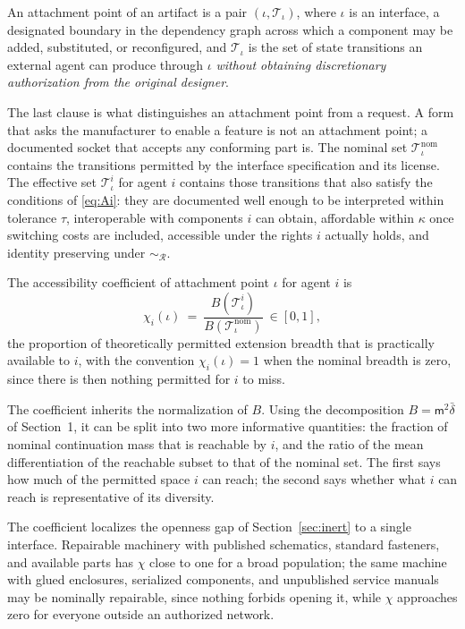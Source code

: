 \begin{definition}
An attachment point of an artifact is a pair $(\iota,\mathcal{T}_\iota)$, where $\iota$ is an interface, a designated boundary in the dependency graph across which a component may be added, substituted, or reconfigured, and $\mathcal{T}_\iota$ is the set of state transitions an external agent can produce through $\iota$ \emph{without obtaining discretionary authorization from the original designer}.
\end{definition}

The last clause is what distinguishes an attachment point from a request. A form that asks the manufacturer to enable a feature is not an attachment point; a documented socket that accepts any conforming part is. The nominal set $\mathcal{T}^{\mathrm{nom}}_\iota$ contains the transitions permitted by the interface specification and its license. The effective set $\mathcal{T}^{i}_\iota$ for agent $i$ contains those transitions that also satisfy the conditions of \eqref{eq:Ai}: they are documented well enough to be interpreted within tolerance $\tau$, interoperable with components $i$ can obtain, affordable within $\kappa$ once switching costs are included, accessible under the rights $i$ actually holds, and identity preserving under $\sim_{\mathcal{R}}$.

\begin{definition}
The accessibility coefficient of attachment point $\iota$ for agent $i$ is
\begin{equation}
\chi_i(\iota)\ =\ \frac{B(\mathcal{T}^{i}_\iota)}{B(\mathcal{T}^{\mathrm{nom}}_\iota)}\ \in[0,1],
\end{equation}
the proportion of theoretically permitted extension breadth that is practically available to $i$, with the convention $\chi_i(\iota)=1$ when the nominal breadth is zero, since there is then nothing permitted for $i$ to miss.
\end{definition}

The coefficient inherits the normalization of $B$. Using the decomposition $B=\mathsf{m}^2\bar\delta$ of Section~1, it can be split into two more informative quantities: the fraction of nominal continuation mass that is reachable by $i$, and the ratio of the mean differentiation of the reachable subset to that of the nominal set. The first says how much of the permitted space $i$ can reach; the second says whether what $i$ can reach is representative of its diversity.

The coefficient localizes the openness gap of Section~\ref{sec:inert} to a single interface. Repairable machinery with published schematics, standard fasteners, and available parts has $\chi$ close to one for a broad population; the same machine with glued enclosures, serialized components, and unpublished service manuals may be nominally repairable, since nothing forbids opening it, while $\chi$ approaches zero for everyone outside an authorized network.

